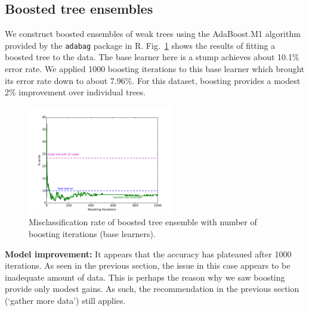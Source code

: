 \documentclass[10pt,letterpaper]{article}
\begin{document}
\subsection{Boosted tree ensembles}
We construct boosted ensembles of weak trees using the AdaBoost.M1 algorithm provided by the {\tt adabag} package in R. Fig.~\ref{boostion1} shows the results of fitting a boosted tree to the data. The base learner here is a stump achieves about 10.1\% error rate. We applied 1000 boosting iterations to this base learner which brought its error rate down to about 7.96\%. For this dataset, boosting provides a modest 2\% improvement over individual trees.
\begin{figure}[!tbp]
	\begin{center}
	\includegraphics[width=2.5in]{../results/ionosphere/boosting/error_vs_boosting_iterations.pdf}
	\end{center}
	\caption{Misclassification rate of boosted tree ensemble with number of boosting iterations (base learners). \label{boostion1}}
\end{figure}

{\bf Model improvement:} It appears that the accuracy has plateaued after 1000 iterations. As seen in the previous section,  the issue in this case appears to be inadequate amount of data. This is perhaps the reason why we saw boosting provide only modest gains. As such, the recommendation in the previous section (`gather more data') still applies. 
\end{document}
